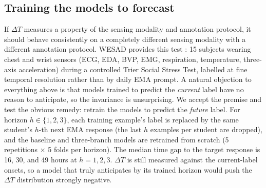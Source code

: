 \documentclass[preprint,12pt,authoryear]{elsarticle}
\newcommand{\dt}{$\Delta T$}
\providecommand{\DIFaddtex}[1]{{\protect\color{blue} \sf #1}} %
\providecommand{\DIFdeltex}[1]{{\protect\color{red} \scriptsize #1}} %
\providecommand{\DIFaddbegin}{} %
\providecommand{\DIFaddend}{} %
\providecommand{\DIFdelbegin}{} %
\providecommand{\DIFdelend}{} %
\providecommand{\DIFadd}[1]{\texorpdfstring{\DIFaddtex{#1}}{#1}} %
\providecommand{\DIFdel}[1]{\texorpdfstring{\DIFdeltex{#1}}{}} %
\newcommand{\DIFscaledelfig}{0.5}
\newlength{\DIFdelgraphicswidth} %
\newlength{\DIFdelgraphicsheight} %
\newcommand{\DIFaddincludegraphics}[2][]{{\color{blue}\fbox{\DIFOincludegraphics[#1]{#2}}}} %
\newcommand{\DIFdelincludegraphics}[2][]{%
\sbox{\DIFdelgraphicsbox}{\DIFOincludegraphics[#1]{#2}}%
\settoboxwidth{\DIFdelgraphicswidth}{\DIFdelgraphicsbox} %
\settoboxtotalheight{\DIFdelgraphicsheight}{\DIFdelgraphicsbox} %
\scalebox{\DIFscaledelfig}{%
\parbox[b]{\DIFdelgraphicswidth}{\usebox{\DIFdelgraphicsbox}\\[-\baselineskip] \rule{\DIFdelgraphicswidth}{0em}}\llap{\resizebox{\DIFdelgraphicswidth}{\DIFdelgraphicsheight}{%
\setlength{\unitlength}{\DIFdelgraphicswidth}%
\begin{picture}(1,1)%
\thicklines\linethickness{2pt} %
{\color[rgb]{1,0,0}\put(0,0){\framebox(1,1){}}}%
{\color[rgb]{1,0,0}\put(0,0){\line( 1,1){1}}}%
{\color[rgb]{1,0,0}\put(0,1){\line(1,-1){1}}}%
\end{picture}%
}\hspace*{3pt}}} %
} %
\DeclareRobustCommand{\DIFaddbegin}{\DIFOaddbegin \let\includegraphics\DIFaddincludegraphics} %
\DeclareRobustCommand{\DIFaddend}{\DIFOaddend \let\includegraphics\DIFOincludegraphics} %
\DeclareRobustCommand{\DIFdelbegin}{\DIFOdelbegin \let\includegraphics\DIFdelincludegraphics} %
\DeclareRobustCommand{\DIFdelend}{\DIFOaddend \let\includegraphics\DIFOincludegraphics} %
\begin{document}
\DIFdelbegin %
\DIFdelend \DIFaddbegin \subsection{Training the models to forecast}
\label{sec:horizon}
\DIFaddend 

\DIFdelbegin \DIFdel{If \dt{} measures a property of the sensing modality and annotation
protocol, it should behave consistently on a completely different
sensing modality with a different annotation protocol. WESAD provides
this test : 15 subjects wearing chest and wrist sensors (ECG, EDA, BVP,
EMG, respiration, temperature, three-axis acceleration) during a
controlled Trier Social Stress Test, labelled at fine temporal
resolution rather than by daily EMA prompt.
}\DIFdelend \DIFaddbegin \DIFadd{A natural objection to everything above is that models trained to
predict the \emph{current} label have no reason to anticipate, so the
invariance is unsurprising. We accept the premise and test the obvious
remedy: retrain the models to predict the \emph{future} label. For
horizon $h \in \{1, 2, 3\}$, each training example's label is replaced
by the same student's $h$-th next EMA response (the last $h$ examples
per student are dropped), and the baseline and three-branch models are
retrained from scratch (5 repetitions $\times$ 5 folds per horizon).
The median time gap to the target response is 16, 30, and 49 hours at
$h = 1, 2, 3$. \dt{} is still measured against the current-label
onsets, so a model that truly anticipates by its trained horizon would
push the \dt{} distribution strongly negative.
}\DIFaddend 
\end{document}
